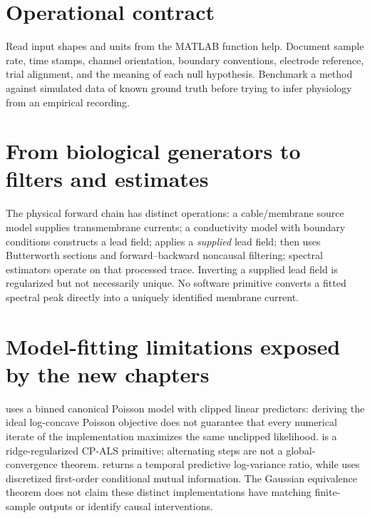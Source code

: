 \section{Operational contract}
Read input shapes and units from the MATLAB function help.
Document sample rate, time stamps, channel orientation,
boundary conventions, electrode reference, trial alignment,
and the meaning of each null hypothesis. Benchmark a method
against simulated data of known ground truth before trying
to infer physiology from an empirical recording.

\section{From biological generators to filters and estimates}
The physical forward chain has distinct operations:
a cable/membrane source model supplies transmembrane currents;
a conductivity model with boundary conditions constructs a lead field;
 applies a \emph{supplied} lead field;
 then uses Butterworth sections and forward--backward
noncausal filtering; spectral estimators operate on that processed trace.
Inverting a supplied lead field is regularized but not necessarily unique.
No software primitive converts a fitted spectral peak directly into a
uniquely identified membrane current.

\section{Model-fitting limitations exposed by the new chapters}
 uses a binned canonical Poisson model with
clipped linear predictors: deriving the ideal log-concave Poisson
objective does not guarantee that every numerical iterate of the
implementation maximizes the same unclipped likelihood.
 is a ridge-regularized CP-ALS primitive; alternating
steps are not a global-convergence theorem. 
returns a temporal predictive log-variance ratio, while
 uses discretized first-order
conditional mutual information. The Gaussian equivalence theorem
does not claim these distinct implementations have matching finite-sample
outputs or identify causal interventions.

